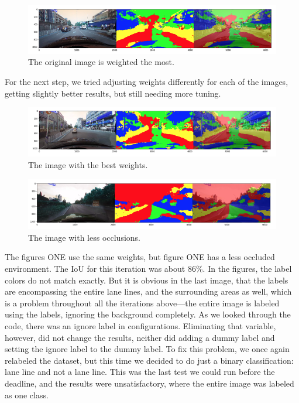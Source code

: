 \documentclass[twoside,twocolumn]{article}
\begin{document}
\begin{figure}
  \includegraphics[width=\linewidth]{4.png}
  \caption{The original image is weighted the most.}
  \label{fig:weights3}
\end{figure}


\par For the next step, we tried adjusting weights differently for each of the images, getting slightly better results, but still needing more tuning.

\begin{figure}
  \includegraphics[width=\linewidth]{5.png}
  \caption{The image with the best weights.}
  \label{fig:best}
\end{figure}

\begin{figure}
  \includegraphics[width=\linewidth]{6.png}
  \caption{The image with less occlusions.}
  \label{fig:occlusions}
\end{figure}

\par The figures ONE use the same weights, but figure ONE has a less occluded environment. The IoU for this iteration was about 86\%. In the figures, the label colors do not match exactly. But it is obvious in the last image, that the labels are encompassing the entire lane lines, and the surrounding areas as well, which is a problem throughout all the iterations above—the entire image is labeled using the labels, ignoring the background completely. As we looked through the code, there was an ignore label in configurations. Eliminating that variable, however, did not change the results, neither did adding a dummy label and setting the ignore label to the dummy label. To fix this problem, we once again relabeled the dataset, but this time we decided to do just a binary classification: lane line and not a lane line. This was the last test we could run before the deadline, and the results were unsatisfactory, where the entire image was labeled as one class.
\end{document}
